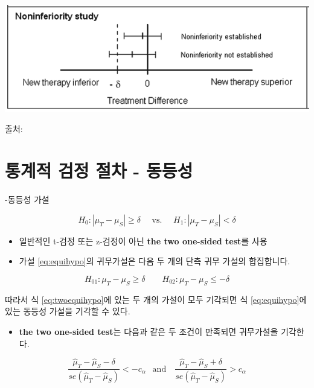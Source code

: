 \documentclass[
]{book}
\providecommand{\tightlist}{%
  \setlength{\itemsep}{0pt}\setlength{\parskip}{0pt}}
\begin{document}
\includegraphics{equiv-inf.png}

출처: \citet{walker2011understanding}

\hypertarget{uxd1b5uxacc4uxc801-uxac80uxc815-uxc808uxcc28---uxb3d9uxb4f1uxc131}{%
\section{통계적 검정 절차 - 동등성}\label{uxd1b5uxacc4uxc801-uxac80uxc815-uxc808uxcc28---uxb3d9uxb4f1uxc131}}

-동등성 가설

\begin{equation}
H_0 : | \mu_T - \mu_S | \ge \delta \quad \text{ vs. } \quad H_1: | \mu_T - \mu_S| < \delta
\label{eq:equihypo}
\end{equation}

\begin{itemize}
\item
  일반적인 t-검정 또는 z-검정이 아닌 \textbf{the two one-sided test}를 사용
\item
  가설 \eqref{eq:equihypo}의 귀무가설은 다음 두 개의 단측 귀무 가설의 합집합니다.
\end{itemize}

\begin{equation}
H_{01} :  \mu_T - \mu_S  \ge \delta \quad  \quad H_{02} :  \mu_T - \mu_S  \le  -\delta
\label{eq:twoequihypo}
\end{equation}

따라서 식 \eqref{eq:twoequihypo}에 있는 두 개의 가설이 모두 기각되면 식 \eqref{eq:equihypo}에 있는 동등성 가설을 기각할 수 있다.

\begin{itemize}
\tightlist
\item
  \textbf{the two one-sided test}는 다음과 같은 두 조건이 만족되면 귀무가설을 기각한다.
\end{itemize}

\[  
\frac{\hat \mu_T - \hat \mu_S - \delta}{se(\hat \mu_T - \hat \mu_S)} < - c_{\alpha}
~~\text{ and }~~~ \frac{\hat \mu_T - \hat \mu_S + \delta}{se(\hat \mu_T - \hat \mu_S)} > c_{\alpha}
\]
\end{document}
